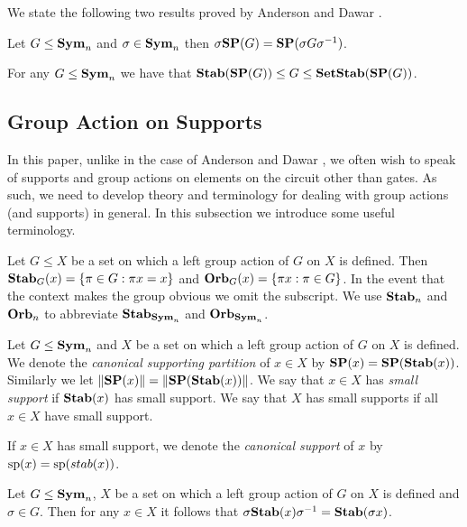 \documentclass[../paper.tex]{subfiles}
\begin{document}
We state the following two results proved by Anderson and Dawar \cite{AndersonD17}.

\begin{lem}
  \label{lem:SP_conjugation}
  Let $G \leq \text{\textbf{Sym}}_n$ and $\sigma \in \text{\textbf{Sym}}_n$ then $\sigma \text{\textbf{SP}} (G) = \text{\textbf{SP}}(\sigma
  G \sigma^{-1})$.
\end{lem}

\begin{lem}
  For any $G \leq \text{\textbf{Sym}}_n$ we have that $\text{\textbf{Stab}} (\text{\textbf{SP}} (G)) \leq G \leq
  \text{\textbf{SetStab}}(\text{\textbf{SP}}(G))$.
\end{lem}

\subsection{Group Action on Supports}
In this paper, unlike in the case of Anderson and Dawar \cite{AndersonD17}, we
often wish to speak of supports and group actions on elements on the circuit other than gates. As such, we need to develop theory and terminology for dealing with group actions (and
supports) in general. In this subsection we introduce some useful terminology.


\begin{definition}
  Let $G \leq X$ be a set on which a left group action of $G$ on $X$ is defined.
  Then $\text{\textbf{Stab}}_G (x) = \{\pi \in G : \pi x = x\}$ and $\text{\textbf{Orb}}_G (x) = \{\pi x : \pi
  \in G\}$. In the event that the context makes the group obvious we omit the
  subscript. We use $\text{\textbf{Stab}}_n$ and $\text{\textbf{Orb}}_n$ to abbreviate $\text{\textbf{Stab}}_{\text{\textbf{Sym}}_n}$ and
  $\text{\textbf{Orb}}_{\text{\textbf{Sym}}_n}$.
\end{definition}

\begin{definition}
  Let $G \leq \text{\textbf{Sym}}_n$ and $X$ be a set on which a left group action of $G$ on
  $X$ is defined. We denote the \emph{canonical supporting partition} of $x\in
  X$ by $\text{\textbf{SP}} (x) = \text{\textbf{SP}} (\text{\textbf{Stab}}(x))$. Similarly we let $\| \text{\textbf{SP}} (x) \| = \| \text{\textbf{SP}}
  (\text{\textbf{Stab}}(x)) \|$. We say that $x \in X$ has \emph{small support} if $\text{\textbf{Stab}}(x)$
  has small support. We say that $X$ has small supports if all $x \in X$
  have small support.

  If $x \in X$ has small support, we denote the \emph{canonical support} of $x$
  by $\text{sp}(x) = \text{sp} (stab(x))$.
\end{definition}

\begin{lem}
  \label{lem:stab_conjugation}
  Let $G \leq \text{\textbf{Sym}}_n$, $X$ be a set on which a left group action of $G$ on $X$
  is defined and $\sigma \in G$. Then for any $x \in X$ it follows that $\sigma
  \text{\textbf{Stab}} (x) \sigma^{-1} = \text{\textbf{Stab}}(\sigma x)$.
\end{lem}
\end{document}
